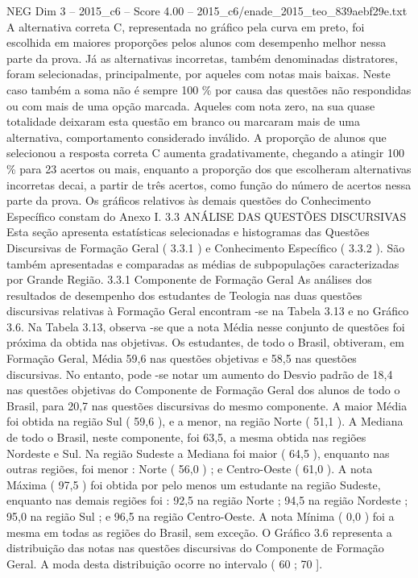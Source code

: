 \begin{textsample}{NEG Dim 3 – 2015\_c6 – Score 4.00 – 2015\_c6/enade\_2015\_teo\_839aebf29e.txt}
A alternativa correta C, representada no gráfico pela curva em preto, foi escolhida em maiores proporções pelos alunos com desempenho melhor nessa parte da prova.
Já as alternativas incorretas, também denominadas distratores, foram selecionadas, principalmente, por aqueles com notas mais baixas.
Neste caso também a soma não é sempre 100 \% por causa das questões não respondidas ou com mais de uma opção marcada.
Aqueles com nota zero, na sua quase totalidade deixaram esta questão em branco ou marcaram mais de uma alternativa, comportamento considerado inválido.
A proporção de alunos que selecionou a resposta correta C aumenta gradativamente, chegando a atingir 100 \% para 23 acertos ou mais, enquanto a proporção dos que escolheram alternativas incorretas decai, a partir de três acertos, como função do número de acertos nessa parte da prova.
Os gráficos relativos às demais questões do Conhecimento Específico constam do Anexo I. 3.3 ANÁLISE DAS QUESTÕES DISCURSIVAS Esta seção apresenta estatísticas selecionadas e histogramas das Questões Discursivas de Formação Geral ( 3.3.1 ) e Conhecimento Específico ( 3.3.2 ).
São também apresentadas e comparadas as médias de subpopulações caracterizadas por Grande Região. 3.3.1 Componente de Formação Geral As análises dos resultados de desempenho dos estudantes de Teologia nas duas questões discursivas relativas à Formação Geral encontram -se na Tabela 3.13 e no Gráfico 3.6.
Na Tabela 3.13, observa -se que a nota Média nesse conjunto de questões foi próxima da obtida nas objetivas.
Os estudantes, de todo o Brasil, obtiveram, em Formação Geral, Média 59,6 nas questões objetivas e 58,5 nas questões discursivas.
No entanto, pode -se notar um aumento do Desvio padrão de 18,4 nas questões objetivas do Componente de Formação Geral dos alunos de todo o Brasil, para 20,7 nas questões discursivas do mesmo componente.
A maior Média foi obtida na região Sul ( 59,6 ), e a menor, na região Norte ( 51,1 ).
A Mediana de todo o Brasil, neste componente, foi 63,5, a mesma obtida nas regiões Nordeste e Sul.
Na região Sudeste a Mediana foi maior ( 64,5 ), enquanto nas outras regiões, foi menor : Norte ( 56,0 ) ; e Centro-Oeste ( 61,0 ).
A nota Máxima ( 97,5 ) foi obtida por pelo menos um estudante na região Sudeste, enquanto nas demais regiões foi : 92,5 na região Norte ; 94,5 na região Nordeste ; 95,0 na região Sul ; e 96,5 na região Centro-Oeste.
A nota Mínima ( 0,0 ) foi a mesma em todas as regiões do Brasil, sem exceção.
O Gráfico 3.6 representa a distribuição das notas nas questões discursivas do Componente de Formação Geral.
A moda desta distribuição ocorre no intervalo ( 60 ; 70 ].

\end{textsample}

